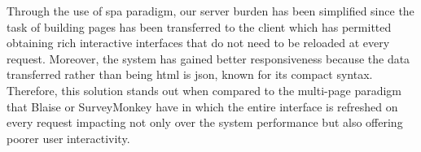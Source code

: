 	Through the use of \gls{spa} paradigm, our server burden has been simplified since the task of building pages has been transferred to the client which has permitted obtaining rich interactive interfaces that do not need to be reloaded at every request. Moreover, the system has gained better responsiveness because the data transferred rather than being \gls{html} is \gls{json}, known for its compact syntax. Therefore, this solution stands out when compared to the multi-page paradigm that Blaise or SurveyMonkey have in which the entire interface is refreshed on every request \cite{proc:mesbah07} impacting not only over the system performance but also offering poorer user interactivity.


	

	



	